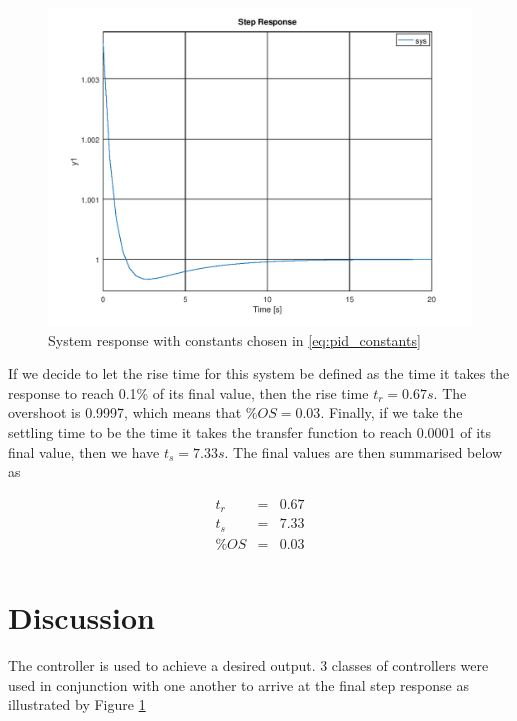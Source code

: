 \documentclass[a4paper, 12pt]{article}
\begin{document}
\begin{figure}[H]
	\centering
	\includegraphics[width=\textwidth]{response.png}
	\caption{System response with constants chosen in \eqref{eq:pid_constants}}
	\label{fig:response}
\end{figure}

If we decide to let the rise time for this system be defined as the time it
takes the response to reach 0.1\% of its final value, then the rise time $t_r
= 0.67s$. The overshoot is 0.9997, which means that $\%OS = 0.03$. Finally, if
we take the settling time to be the time it takes the transfer function to
reach 0.0001 of its final value, then we have $t_s = 7.33s$. The final values
are then summarised below as

\begin{equation}
  \begin{array}{rcl}
    t_r & = & 0.67 \\
    t_s & = & 7.33 \\
    \%OS & = & 0.03 \\
  \end{array}
  \label{eq:finalstats}
\end{equation}

\section{Discussion} %
\label{sec:discussion}
The controller is used to achieve a desired output. 3 classes of controllers
were used in conjunction with one another to arrive at the final step response
as illustrated by Figure \ref{fig:response}
\end{document}
